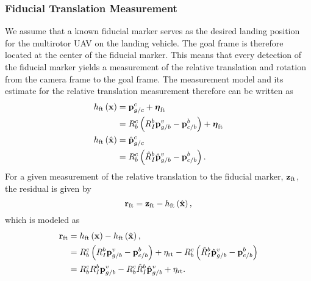 \subsubsection{Fiducial Translation Measurement}
We assume that a known fiducial marker serves as the desired landing position
for the multirotor UAV on the landing vehicle. The goal frame is therefore
located at the center of the fiducial marker. This means that every detection of the fiducial
marker yields a measurement of the relative translation and rotation from the
camera frame to the goal frame.
The measurement model and its estimate for the relative translation measurement
therefore can be written as
\begin{align}
  h_{\text{ft}} \left( \boldsymbol{\mathrm{x}} \right) &=
  \boldsymbol{\mathrm{p}}_{g/c}^c + \boldsymbol{\mathrm{\eta}}_{\text{ft}} \\
  &= R_b^c \left( R_I^b \boldsymbol{\mathrm{p}}_{g/b}^v -
  \boldsymbol{\mathrm{p}}_{c/b}^b \right) + \boldsymbol{\mathrm{\eta}}_{\text{ft}} \\
  h_{\text{ft}} \left( \hat{\boldsymbol{\mathrm{x}}} \right) &=
    \hat{\boldsymbol{\mathrm{p}}}_{g/c}^c \\
  &= R_b^c \left( \hat{R}_I^b \hat{\boldsymbol{\mathrm{p}}}_{g/b}^v -
    \boldsymbol{\mathrm{p}}_{c/b}^b \right). 
\end{align}
For a given measurement of the relative translation to the fiducial marker,
$\boldsymbol{\mathrm{z}}_{\text{ft}}$, the residual is given by
\begin{equation}
  \boldsymbol{\mathrm{r}}_{\text{ft}} = \boldsymbol{\mathrm{z}}_{\text{ft}} - h_{\text{ft}} \left( \hat{\boldsymbol{\mathrm{x}}}
  \right),
\end{equation}
which is modeled as
\begin{align}
  \boldsymbol{\mathrm{r}}_{\text{ft}} &=  h_{\text{ft}} \left( \boldsymbol{\mathrm{x}} \right) - h_{\text{ft}} \left( \hat{\boldsymbol{\mathrm{x}}}
  \right), \\
                       &= R_b^c \left( R_I^b \boldsymbol{\mathrm{p}}_{g/b}^v -
                         \boldsymbol{\mathrm{p}}_{c/b}^b \right)  +\eta_{\text{rt}} - R_b^c \left( \hat{R}_I^b \hat{\boldsymbol{\mathrm{p}}}_{g/b}^v -
    \boldsymbol{\mathrm{p}}_{c/b}^b \right)  \\
                       &= R_b^c R_I^b \boldsymbol{\mathrm{p}}_{g/b}^v 
                          - R_b^c \hat{R}_I^b \hat{\boldsymbol{\mathrm{p}}}_{g/b}^v +
                          \eta_{\text{rt}}.
                          \label{eq:rft_1}
\end{align}

